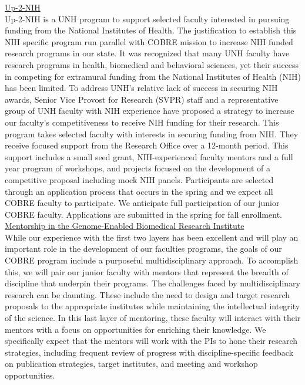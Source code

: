 \documentclass[11pt]{article}
\begin{document}
\noindent \ul{Up-2-NIH}  \\

Up-2-NIH is a UNH program to support selected faculty interested in pursuing funding from the National Institutes of Health. The justification to establish this NIH specific program run parallel with COBRE mission to increase NIH funded research programs in our state.  It was recognized that many UNH faculty have research programs in health, biomedical and behavioral sciences, yet their success in competing for extramural funding from the National Institutes of Health (NIH) has been limited.  To address UNH’s relative lack of success in securing NIH awards, Senior Vice Provost for Research (SVPR) staff and a representative group of UNH faculty with NIH experience have proposed a strategy to increase our faculty’s competitiveness to receive NIH funding for their research.  This program takes selected faculty with interests in securing funding from NIH.   They receive focused support from the Research Office over a 12-month period.  This support includes a small seed grant, NIH-experienced faculty mentors and a full year program of workshops, and projects focused on the development of a competitive proposal including mock NIH panels.   Participants are selected through an application process that occurs in the spring and we expect all COBRE faculty to participate. We anticipate full participation of our junior COBRE faculty.  Applications are submitted in the spring for fall enrollment.  \\

\noindent \ul{Mentorship in the Genome-Enabled Biomedical Research Institute} \\

While our experience with the first two layers has been excellent and will play an important role in the development of our faculties programs, the goals of our COBRE program include a purposeful multidisciplinary approach.  To accomplish this, we will pair our junior faculty with mentors that represent the breadth of discipline that underpin their programs.  The challenges faced by multidisciplinary research can be daunting.  These include the need to design and target research proposals to the appropriate institutes while maintaining the intellectual integrity of the science.  In this last layer of mentoring, these faculty will interact with their mentors with a focus on opportunities for enriching their knowledge.  We specifically expect that the mentors will work with the PIs to hone their research strategies, including frequent review of progress with discipline-specific feedback on publication strategies, target institutes, and meeting and workshop opportunities.    \\
\end{document}
